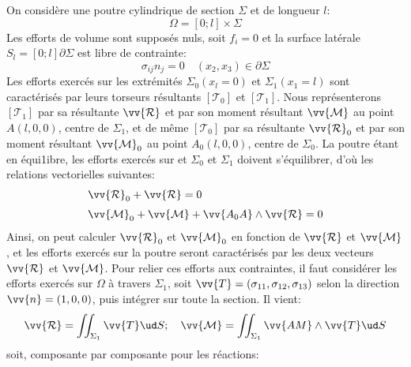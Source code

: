 On considère une poutre cylindrique de section $\Sigma$ et de longueur $l$:
\begin{equation*}     
\Omega = \left[ 0;l \right] \times \Sigma
\end{equation*}
Les efforts de volume sont supposés nuls, soit $f_i= 0$ et la surface latérale  $S_l= \left[ 0;l \right]\partial \Sigma$ est libre de contrainte:
\begin{equation}
    \sigma_{ij} n_j = 0 \quad \left( x_2, x_3 \right) \in \partial \Sigma
    \label{eq:Ch07-001}
\end{equation}
Les efforts exercés sur les extrémités $\Sigma_0 \left( x_l =0 \right)$ et $\Sigma_1 \left( x_1 =l \right)$ sont caractérisés par leurs torseurs résultants $\left[ \mathcal{T}_0 \right]$ et $\left[ \mathcal{T}_1 \right]$.
Nous représenterons $\left[ \mathcal{T}_1 \right]$ par sa résultante $\vv{\mathcal{R}}$ et par son moment résultant $\vv{\mathcal{M}}$ au point $A\left( l,0,0 \right)$, centre de $\Sigma_1$, et de même $\left[ \mathcal{T}_0 \right]$ par sa résultante $\vv{\mathcal{R}}_0$ et par son moment résultant $\vv{\mathcal{M}}_0$ au point $A_0\left( l,0,0 \right)$, centre de $\Sigma_0$.
La poutre étant en équi1ibre, les efforts exercés sur et $\Sigma_0$ et $\Sigma_1$ doivent s'équilibrer, d'où les relations vectorielles suivantes:
\begin{equation}
    \begin{aligned}
        & \vv{\mathcal{R}}_0 + \vv{\mathcal{R}} = 0 \\[3pt]
        & \vv{\mathcal{M}}_0 + \vv{\mathcal{M}} + \vv{A_0 A} \wedge  \vv{\mathcal{R}} = 0
    \end{aligned}
    \label{eq:Ch07-002}
\end{equation}
Ainsi, on peut calculer $\vv{\mathcal{R}}_0$ et $\vv{\mathcal{M}}_0$ en fonction de $\vv{\mathcal{R}}$ et $\vv{\mathcal{M}}$, et les efforts exercés sur la poutre seront caractérisés par les deux vecteurs $\vv{\mathcal{R}}$ et $\vv{\mathcal{M}}$.
Pour relier ces efforts aux contraintes, il faut considérer les efforts exercés sur $\Omega$ à travers  $\Sigma_1$, soit $\vv{T} = \left( \sigma_{11}, \sigma_{12}, \sigma_{13} \right)$ selon la direction $\vv{n} = \left( 1,0,0 \right)$, puis intégrer sur toute la section.
Il vient:
\begin{equation}
    \vv{\mathcal{R}} = \iint_{\Sigma_1} \vv{T} \ud S;\quad \vv{\mathcal{M}} = \iint_{\Sigma_1} \vv{AM} \wedge \vv{T} \ud S
    \label{eq:Ch07-004}
\end{equation}
soit, composante par composante pour les réactions:
